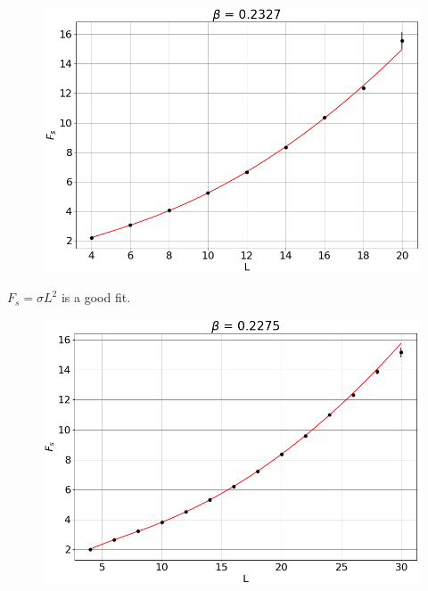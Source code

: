 \documentclass[12pt,handout]{beamer}
\begin{document}
\begin{frame}
\begin{center}
\begin{figure}[!htb]
\centering
\includegraphics[scale=0.4, center]{02327.png}
\end{figure}
$F_s = \sigma L^2$ is a good fit.
\end{center}
\end{frame}

\begin{frame}
\begin{center}
\begin{figure}[!htb]
\centering
\includegraphics[scale=0.4, center]{02275.png}
\end{figure}
\end{center}
\end{frame}
\end{document}
